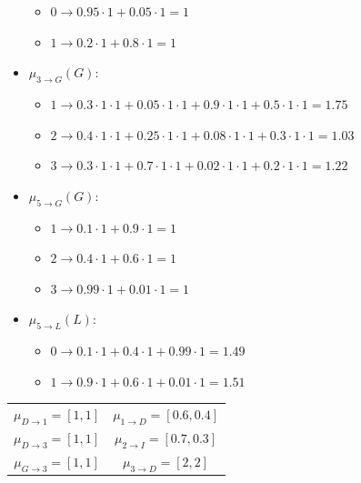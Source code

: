 \begin{example}
\begin{itemize}
            \begin{itemize}
                \item $0 \rightarrow 0.95 \cdot 1 + 0.05 \cdot 1 =1$
                \item $1 \rightarrow 0.2 \cdot 1 + 0.8 \cdot 1 =1$
            \end{itemize}
        \item $\mu_{3 \rightarrow G}(G)$:
            \begin{itemize}
                \item $1 \rightarrow 0.3 \cdot 1 \cdot 1 + 0.05 \cdot 1 \cdot 1 + 0.9 \cdot 1 \cdot 1 + 0.5 \cdot 1 \cdot 1 = 1.75$
                \item $2 \rightarrow 0.4 \cdot 1 \cdot 1 + 0.25 \cdot 1 \cdot 1 + 0.08 \cdot 1 \cdot 1 + 0.3 \cdot 1 \cdot 1 = 1.03$
                \item $3 \rightarrow 0.3 \cdot 1 \cdot 1 + 0.7 \cdot 1 \cdot 1 + 0.02 \cdot 1 \cdot 1 + 0.2 \cdot 1 \cdot 1 = 1.22$
            \end{itemize}
        \item $\mu_{5 \rightarrow G}(G)$:
            \begin{itemize}
                \item $1 \rightarrow 0.1 \cdot 1 + 0.9 \cdot 1 = 1$
                \item $2 \rightarrow 0.4 \cdot 1 + 0.6 \cdot 1  = 1$
                \item $3 \rightarrow 0.99 \cdot 1 + 0.01 \cdot 1  = 1$
            \end{itemize}
        \item $\mu_{5 \rightarrow L}(L)$:
            \begin{itemize}
                \item $0 \rightarrow 0.1 \cdot 1 + 0.4 \cdot 1 + 0.99 \cdot 1 = 1.49$
                \item $1 \rightarrow 0.9 \cdot 1 + 0.6 \cdot 1 + 0.01 \cdot 1 = 1.51$
            \end{itemize}
    \end{itemize}
    \begin{table}[H]
        \centering
        \begin{tabular}{cc}
        \hline
        $\mu_{D \rightarrow 1}=[1,1]$ & $\mu_{1 \rightarrow D}=[0.6,0.4]$   \\
        $\mu_{D \rightarrow 3}=[1,1]$ & $\mu_{2 \rightarrow I}=[0.7,0.3]$   \\
        $\mu_{G \rightarrow 3}=[1,1]$ & $\mu_{3 \rightarrow D}=[2,2]$   \\

\end{tabular}
\end{table}
\end{example}
